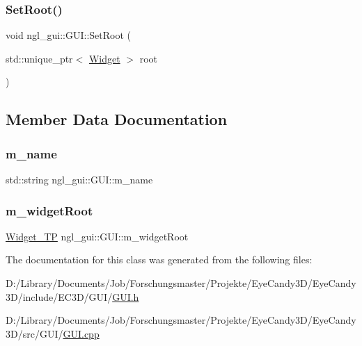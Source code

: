 \subsubsection{\texorpdfstring{Set\+Root()}{SetRoot()}}
{\footnotesize\ttfamily void ngl\+\_\+gui\+::\+G\+U\+I\+::\+Set\+Root (\begin{DoxyParamCaption}\item[{std\+::unique\+\_\+ptr$<$ \mbox{\hyperlink{classngl__gui_1_1_widget}{Widget}} $>$}]{root }\end{DoxyParamCaption})}



\subsection{Member Data Documentation}
\mbox{\label{classngl__gui_1_1_g_u_i_a45db809e6b975c853ee96916fda68758}} 
\subsubsection{\texorpdfstring{m\+\_\+name}{m\_name}}
{\footnotesize\ttfamily std\+::string ngl\+\_\+gui\+::\+G\+U\+I\+::m\+\_\+name\hspace{0.3cm}{\ttfamily [protected]}}

\mbox{\label{classngl__gui_1_1_g_u_i_a8db080c30a3cbfc27879dacd7537b821}} 
\subsubsection{\texorpdfstring{m\+\_\+widget\+Root}{m\_widgetRoot}}
{\footnotesize\ttfamily \mbox{\hyperlink{classngl__gui_1_1_g_u_i_af4d527c3697ea8524c7af82bb855286d}{Widget\+\_\+\+TP}} ngl\+\_\+gui\+::\+G\+U\+I\+::m\+\_\+widget\+Root\hspace{0.3cm}{\ttfamily [protected]}}



The documentation for this class was generated from the following files\+:\begin{DoxyCompactItemize}
\item 
D\+:/\+Library/\+Documents/\+Job/\+Forschungsmaster/\+Projekte/\+Eye\+Candy3\+D/\+Eye\+Candy3\+D/include/\+E\+C3\+D/\+G\+U\+I/\mbox{\hyperlink{_g_u_i_8h}{G\+U\+I.\+h}}\item 
D\+:/\+Library/\+Documents/\+Job/\+Forschungsmaster/\+Projekte/\+Eye\+Candy3\+D/\+Eye\+Candy3\+D/src/\+G\+U\+I/\mbox{\hyperlink{_g_u_i_8cpp}{G\+U\+I.\+cpp}}\end{DoxyCompactItemize}
